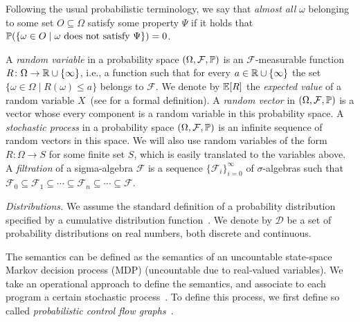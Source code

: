 Following the usual probabilistic terminology, we say that \emph{almost all} $\omega$ belonging to some set $O\subseteq \Omega$ satisfy some property $\Psi$ if it holds that $\mathbb{P}{(\{\omega\in O\mid \omega \text{ does not satisfy }\Psi\})}=0$.

A \emph{random variable} in a probability space $(\Omega,\mathcal{F},\mathbb{P})$ is
an $\mathcal{F}$-measurable function $R\colon \Omega \rightarrow \mathbb{R} \cup
\{\infty\}$, i.e.,
a function such that for every $a\in \mathbb{R} \cup \{ \infty\}$ the set
$\{\omega\in \Omega\mid R(\omega)\leq a\}$ belongs to $\mathcal{F}$.
We denote by $\mathbb{E}[R]$ the \emph{expected value} of a random variable $X$~(see \cite[Chapter 5]{Billingsley:book}
for a formal definition). 
A \emph{random vector} in $(\Omega,\mathcal{F},\mathbb{P})$ is a vector whose every component is a random 
variable in this probability space. A \emph{stochastic process} in a 
probability space $(\Omega,\mathcal{F},\mathbb{P})$ is an infinite sequence of 
random vectors in this space.
We will also use random variables of the form $R\colon\Omega \rightarrow S$ for some finite 
set $S$, which is easily translated to the variables above.
A \emph{filtration} of a sigma-algebra $\mathcal{F}$ is a
sequence $\{\mathcal{F}_i \}_{i=0}^{\infty}$ of $\sigma$-algebras 
such that $\mathcal{F}_0 \subseteq \mathcal{F}_1 \subseteq \cdots \subseteq
\mathcal{F}_n \subseteq \cdots \subseteq \mathcal{F}$.

\emph{Distributions.} We assume the standard definition of a probability 
distribution specified by a cumulative distribution 
function~\cite{Billingsley:book}. We denote by $\mathcal{D}$ be a set of 
probability distributions on 
real numbers, both discrete and continuous.

\smallskip{}
The semantics can be defined as the semantics of an uncountable state-space
Markov decision process (MDP) (uncountable due to real-valued variables).
We take an operational approach to define the semantics, and associate to each program 
a certain stochastic process~\cite{SriramCAV,HolgerPOPL,Kozen:prob-semantics}.
To define this process, we first define so called 
\emph{probabilistic control flow graphs}~\cite{CFG16:positivstellensatz-arxiv}.

